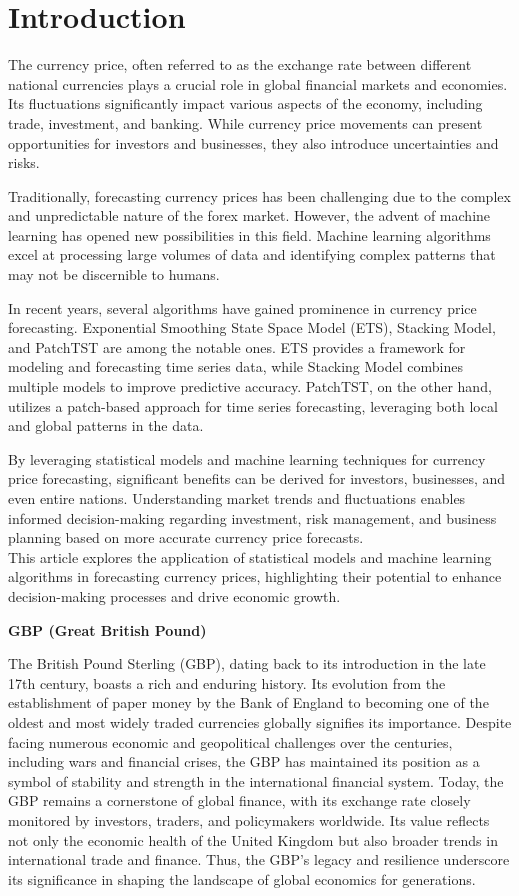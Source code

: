 \documentclass{ieeeojies}
\begin{document}
\section{Introduction}
\label{sec:introduction}
The currency price, often referred to as the exchange rate between different national currencies plays a crucial role in global financial markets and economies. Its fluctuations significantly impact various aspects of the economy, including trade, investment, and banking. While currency price movements can present opportunities for investors and businesses, they also introduce uncertainties and risks.\par
\noindent
Traditionally, forecasting currency prices has been challenging due to the complex and unpredictable nature of the forex market. However, the advent of machine learning has opened new possibilities in this field. Machine learning algorithms excel at processing large volumes of data and identifying complex patterns that may not be discernible to humans.\par
\noindent
In recent years, several algorithms have gained prominence in currency price forecasting. Exponential Smoothing State Space Model (ETS), Stacking Model, and PatchTST are among the notable ones. ETS provides a framework for modeling and forecasting time series data, while Stacking Model combines multiple models to improve predictive accuracy. PatchTST, on the other hand, utilizes a patch-based approach for time series forecasting, leveraging both local and global patterns in the data.\par
\noindent
By leveraging statistical models and machine learning techniques for currency price forecasting, significant benefits can be derived for investors, businesses, and even entire nations. Understanding market trends and fluctuations enables informed decision-making regarding investment, risk management, and business planning based on more accurate currency price forecasts.\\
\noindent
This article explores the application of statistical models and machine learning algorithms in forecasting currency prices, highlighting their potential to enhance decision-making processes and drive economic growth.

\bigskip
\raggedright\textbf{GBP (Great British Pound)}
\bigskip

The British Pound Sterling (GBP), dating back to its introduction in the late 17th century, boasts a rich and enduring history. Its evolution from the establishment of paper money by the Bank of England to becoming one of the oldest and most widely traded currencies globally signifies its importance. Despite facing numerous economic and geopolitical challenges over the centuries, including wars and financial crises, the GBP has maintained its position as a symbol of stability and strength in the international financial system. Today, the GBP remains a cornerstone of global finance, with its exchange rate closely monitored by investors, traders, and policymakers worldwide. Its value reflects not only the economic health of the United Kingdom but also broader trends in international trade and finance. Thus, the GBP's legacy and resilience underscore its significance in shaping the landscape of global economics for generations.
\end{document}
